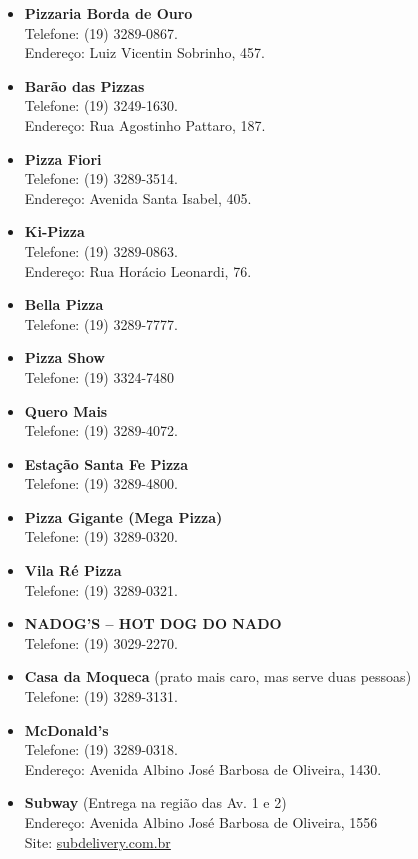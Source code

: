 \begin{itemize}
\item   \textbf{Pizzaria Borda de Ouro}
        \\Telefone: (19) 3289-0867.
        \\Endereço: Luiz Vicentin Sobrinho, 457.

\item   \textbf{Barão das Pizzas}
        \\Telefone: (19) 3249-1630.
        \\Endereço: Rua Agostinho Pattaro, 187.

\item   \textbf{Pizza Fiori}
        \\Telefone: (19) 3289-3514.
        \\Endereço: Avenida Santa Isabel, 405.

\item   \textbf{Ki-Pizza}
        \\Telefone: (19) 3289-0863.
        \\Endereço: Rua Horácio Leonardi, 76.

\item   \textbf{Bella Pizza}
        \\Telefone: (19) 3289-7777.

\item   \textbf{Pizza Show}
        \\Telefone: (19) 3324-7480

\item   \textbf{Quero Mais}
        \\Telefone: (19) 3289-4072.

\item   \textbf{Estação Santa Fe Pizza}
        \\Telefone: (19) 3289-4800.

\item   \textbf{Pizza Gigante (Mega Pizza)}
        \\Telefone: (19) 3289-0320.

\item   \textbf{Vila Ré Pizza}
        \\Telefone: (19) 3289-0321.

\item   \textbf{NADOG'S -- HOT DOG DO NADO}
        \\Telefone: (19) 3029-2270.

\item   \textbf{Casa da Moqueca} (prato mais caro, mas serve duas pessoas)
        \\Telefone: (19) 3289-3131.

\item   \textbf{McDonald's}
        \\Telefone: (19) 3289-0318.
        \\Endereço: Avenida Albino José Barbosa de Oliveira, 1430.

\item   \textbf{Subway} (Entrega na região das Av. 1 e 2)
        \\Endereço: Avenida Albino José Barbosa de Oliveira, 1556
        \\Site: \url{subdelivery.com.br}
\end{itemize}


